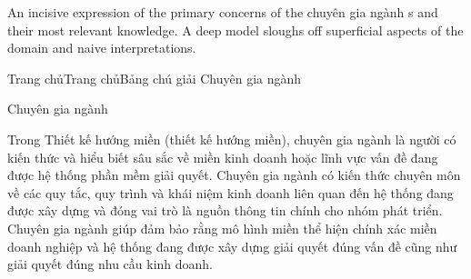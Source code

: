 An incisive expression of the primary concerns of the chuyên gia ngành s and their most relevant knowledge. A deep model sloughs off superficial aspects of the domain and naive interpretations.












Trang chủTrang chủBảng chú giải Chuyên gia ngành

Chuyên gia ngành

Trong Thiết kế hướng miền (thiết kế hướng miền), chuyên gia ngành là người có kiến thức và hiểu biết sâu sắc về miền kinh doanh hoặc lĩnh vực vấn đề đang được hệ thống phần mềm giải quyết. Chuyên gia ngành có kiến thức chuyên môn về các quy tắc, quy trình và khái niệm kinh doanh liên quan đến hệ thống đang được xây dựng và đóng vai trò là nguồn thông tin chính cho nhóm phát triển. Chuyên gia ngành giúp đảm bảo rằng mô hình miền thể hiện chính xác miền doanh nghiệp và hệ thống đang được xây dựng giải quyết đúng vấn đề cũng như giải quyết đúng nhu cầu kinh doanh.

